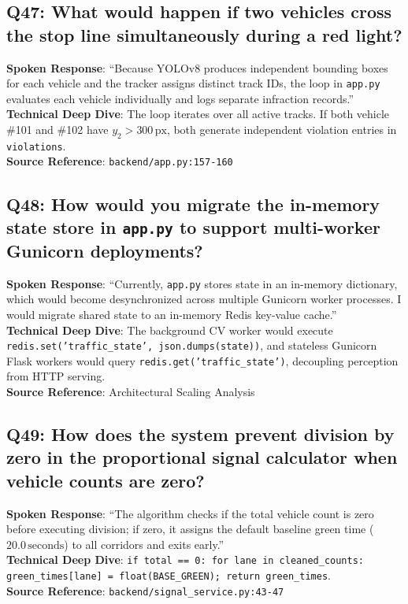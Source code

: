 \documentclass[11pt,a4paper,oneside]{report}
\begin{document}
\subsection*{Q47: What would happen if two vehicles cross the stop line simultaneously during a red light?}
\begin{interviewbox}
\textbf{Spoken Response}: ``Because YOLOv8 produces independent bounding boxes for each vehicle and the tracker assigns distinct track IDs, the loop in \texttt{app.py} evaluates each vehicle individually and logs separate infraction records.''\\
\textbf{Technical Deep Dive}: The loop iterates over all active tracks. If both vehicle \#101 and \#102 have $y_2 > 300\,\text{px}$, both generate independent violation entries in \texttt{violations}.\\
\textbf{Source Reference}: \texttt{backend/app.py:157-160}
\end{interviewbox}

\subsection*{Q48: How would you migrate the in-memory state store in \texttt{app.py} to support multi-worker Gunicorn deployments?}
\begin{interviewbox}
\textbf{Spoken Response}: ``Currently, \texttt{app.py} stores state in an in-memory dictionary, which would become desynchronized across multiple Gunicorn worker processes. I would migrate shared state to an in-memory Redis key-value cache.''\\
\textbf{Technical Deep Dive}: The background CV worker would execute \texttt{redis.set('traffic\_state', json.dumps(state))}, and stateless Gunicorn Flask workers would query \texttt{redis.get('traffic\_state')}, decoupling perception from HTTP serving.\\
\textbf{Source Reference}: Architectural Scaling Analysis
\end{interviewbox}

\subsection*{Q49: How does the system prevent division by zero in the proportional signal calculator when vehicle counts are zero?}
\begin{interviewbox}
\textbf{Spoken Response}: ``The algorithm checks if the total vehicle count is zero before executing division; if zero, it assigns the default baseline green time ($20.0\,\text{seconds}$) to all corridors and exits early.''\\
\textbf{Technical Deep Dive}: \texttt{if total == 0: for lane in cleaned\_counts: green\_times[lane] = float(BASE\_GREEN); return green\_times}.\\
\textbf{Source Reference}: \texttt{backend/signal\_service.py:43-47}
\end{interviewbox}
\end{document}
